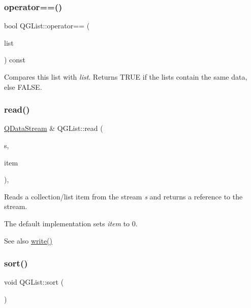 \mbox{\label{class_q_g_list_a66d00b29e3ce5513eed4b28652039a4c}} 
\subsubsection{\texorpdfstring{operator==()}{operator==()}}
{\footnotesize\ttfamily bool Q\+G\+List\+::operator== (\begin{DoxyParamCaption}\item[{const \mbox{\hyperlink{class_q_g_list}{Q\+G\+List}} \&}]{list }\end{DoxyParamCaption}) const\hspace{0.3cm}{\ttfamily [protected]}}

Compares this list with {\itshape list}. Returns T\+R\+UE if the lists contain the same data, else F\+A\+L\+SE. \mbox{\label{class_q_g_list_a96dd0ec54d1aca071fa29432dc0c2e8e}} 
\subsubsection{\texorpdfstring{read()}{read()}}
{\footnotesize\ttfamily \mbox{\hyperlink{class_q_data_stream}{Q\+Data\+Stream}} \& Q\+G\+List\+::read (\begin{DoxyParamCaption}\item[{\mbox{\hyperlink{class_q_data_stream}{Q\+Data\+Stream}} \&}]{s,  }\item[{Q\+Collection\+::\+Item \&}]{item }\end{DoxyParamCaption})\hspace{0.3cm}{\ttfamily [protected]}, {\ttfamily [virtual]}}

Reads a collection/list item from the stream {\itshape s} and returns a reference to the stream.

The default implementation sets {\itshape item} to 0.

\begin{DoxySeeAlso}{See also}
\mbox{\hyperlink{structcmd_8h_af2a3ea719b83f672637febdd87c36c36}{write()}} 
\end{DoxySeeAlso}
\mbox{\label{class_q_g_list_aafb785818e1ff9a3a72daacabd549b54}} 
\subsubsection{\texorpdfstring{sort()}{sort()}}
{\footnotesize\ttfamily void Q\+G\+List\+::sort (\begin{DoxyParamCaption}{ }\end{DoxyParamCaption})\hspace{0.3cm}{\ttfamily [protected]}}

